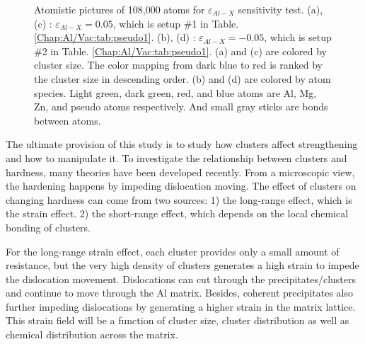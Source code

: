 \begin{figure}[!ht]
\caption[Atomistic pictures of 108,000 atoms for $\varepsilon_{Al-X}$ sensitivity test.]{Atomistic pictures of 108,000 atoms for $\varepsilon_{Al-X}$ sensitivity test. (a), (c) : $\varepsilon_{Al-X} = 0.05$, which is setup \#1 in Table. \ref{Chap:Al/Vac:tab:pseudo1}. (b), (d) : $\varepsilon_{Al-X} = -0.05$, which is setup \#2 in Table. \ref{Chap:Al/Vac:tab:pseudo1}. (a) and (c) are colored by cluster size. The color mapping from dark blue to red is ranked by the cluster size in descending order. (b) and (d) are colored by atom species. Light green, dark green, red, and blue atoms are Al, Mg, Zn, and pseudo atoms respectively. And small gray sticks are bonds between atoms.}
\label{Chap:Al/Vac:fig:sens_Al}
\end{figure}
\endgroup

The ultimate provision of this study is to study how clusters affect strengthening and how to manipulate it. To investigate the relationship between clusters and hardness, many theories have been developed recently. \cite{yasi2010first, starink2009thermodynamics, curtin2006predictive} From a microscopic view, the hardening happens by impeding dislocation moving. The effect of clusters on changing hardness can come from two sources: 1) the long-range effect, which is the strain effect. 2) the short-range effect, which depends on the local chemical bonding of clusters. 

For the long-range strain effect, each cluster provides only a small amount of resistance, but the very high density of clusters generates a high strain to impede the dislocation movement. Dislocations can cut through the precipitates/clusters and continue to move through the Al matrix. Besides, coherent precipitates also further impeding dislocations by generating a higher strain in the matrix lattice. This strain field will be a function of cluster size, cluster distribution as well as chemical distribution across the matrix.

